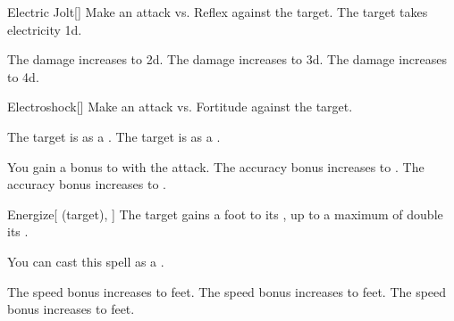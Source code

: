 \lowercase{\hypertarget{spell:Electric Jolt}{}}\label{spell:Electric Jolt}
\begin{freeability}[Rank 1]{\hypertarget{spell:Electric Jolt}{Electric Jolt}}[]
Make an attack vs. Reflex against the target.
\hit The target takes electricity  \plus1d.

\rankline
{} The damage increases to  \plus2d.
 The damage increases to  \plus3d.
 The damage increases to  \plus4d.
\end{freeability}
\vspace{0.25em}



\lowercase{\hypertarget{spell:Electroshock}{}}\label{spell:Electroshock}
\begin{freeability}[Rank 1]{\hypertarget{spell:Electroshock}{Electroshock}}[]
Make an attack vs. Fortitude against the target.

\hit The target is  as a .
\crit The target is  as a .

\rankline
{} You gain a  bonus to  with the attack.
 The accuracy bonus increases to .
 The accuracy bonus increases to .
\end{freeability}
\vspace{0.25em}



\lowercase{\hypertarget{spell:Energize}{}}\label{spell:Energize}
\begin{attuneability}[Rank 2]{\hypertarget{spell:Energize}{Energize}}[ (target), ]
The target gains a  foot  to its , up to a maximum of double its .

You can cast this spell as a .

\rankline
{} The speed bonus increases to  feet.
 The speed bonus increases to  feet.
 The speed bonus increases to  feet.
\end{attuneability}
\vspace{0.25em}



